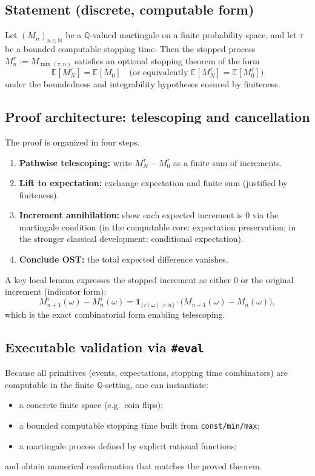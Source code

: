 \documentclass[11pt]{article}
\newcommand{\NN}{\mathbb{N}}
\newcommand{\QQ}{\mathbb{Q}}
\newcommand{\EE}{\mathbb{E}}
\begin{document}
\subsection{Statement (discrete, computable form)}
Let $(M_n)_{n\in\NN}$ be a $\QQ$-valued martingale on a finite probability space, and let $\tau$ be a bounded computable stopping time. Then the stopped process $M^\tau_n := M_{\min(\tau,n)}$ satisfies an optional stopping theorem of the form
\[
\EE[M^\tau_N] = \EE[M_0]
\quad\text{(or equivalently }\EE[M^\tau_N]=\EE[M^\tau_0]\text{)}
\]
under the boundedness and integrability hypotheses ensured by finiteness.

\subsection{Proof architecture: telescoping and cancellation}
The proof is organized in four steps.
\begin{enumerate}[leftmargin=1.2em]
\item \textbf{Pathwise telescoping:} write $M^\tau_N - M^\tau_0$ as a finite sum of increments.
\item \textbf{Lift to expectation:} exchange expectation and finite sum (justified by finiteness).
\item \textbf{Increment annihilation:} show each expected increment is $0$ via the martingale condition (in the computable core: expectation preservation; in the stronger classical development: conditional expectation).
\item \textbf{Conclude OST:} the total expected difference vanishes.
\end{enumerate}

A key local lemma expresses the stopped increment as either $0$ or the original increment (indicator form):
\[
M^\tau_{n+1}(\omega)-M^\tau_n(\omega)
=
\mathbf{1}_{\{\tau(\omega)>n\}} \cdot \bigl(M_{n+1}(\omega)-M_n(\omega)\bigr),
\]
which is the exact combinatorial form enabling telescoping.

\subsection{Executable validation via \texttt{\#eval}}
Because all primitives (events, expectations, stopping time combinators) are computable in the finite $\QQ$-setting, one can instantiate:
\begin{itemize}[leftmargin=1.2em]
\item a concrete finite space (e.g.\ coin flips);
\item a bounded computable stopping time built from \texttt{const/min/max};
\item a martingale process defined by explicit rational functions;
\end{itemize}
and obtain numerical confirmation that matches the proved theorem.
\end{document}
